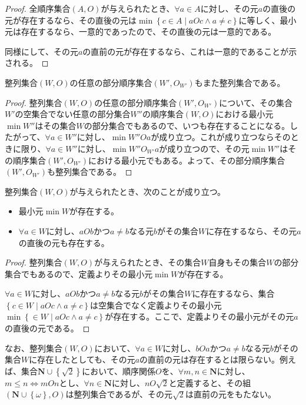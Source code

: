 \documentclass[dvipdfmx]{jsarticle}
\begin{document}
\begin{proof}
全順序集合$(A,O)$が与えられたとき、$\forall a \in A$に対し、その元$a$の直後の元が存在するなら、その直後の元は$\min\left\{ c \in A \middle| aOc \land a \neq c \right\}$に等しく、最小元は存在するなら、一意的であったので、その直後の元は一意的である。\par
同様にして、その元$a$の直前の元が存在するなら、これは一意的であることが示される。
\end{proof}
\begin{thm}\label{1.3.2.4}
整列集合$(W,O)$の任意の部分順序集合$\left( W',O_{W'} \right)$もまた整列集合である。
\end{thm}
\begin{proof}
整列集合$(W,O)$の任意の部分順序集合$\left( W',O_{W'} \right)$について、その集合$W'$の空集合でない任意の部分集合$W''$の順序集合$(W,O)$における最小元$\min W''$はその集合$W$の部分集合でもあるので、いつも存在することになる。したがって、$\forall a \in W''$に対し、$\min W''Oa$が成り立つ。これが成り立つならそのときに限り、$\forall a \in W''$に対し、$\min W''O_{W'}a$が成り立つので、その元$\min W''$はその順序集合$\left( W',O_{W'} \right)$における最小元でもある。よって、その部分順序集合$\left( W',O_{W'} \right)$も整列集合である。
\end{proof}
\begin{thm}\label{1.3.2.5}
整列集合$(W,O)$が与えられたとき、次のことが成り立つ。
\begin{itemize}
\item
  最小元$\min W$が存在する。
\item
  $\forall a \in W$に対し、$aOb$かつ$a \neq b$なる元$b$がその集合$W$に存在するなら、その元$a$の直後の元も存在する。
\end{itemize}
\end{thm}
\begin{proof}
整列集合$(W,O)$が与えられたとき、その集合$W$自身もその集合$W$の部分集合でもあるので、定義よりその最小元$\min W$が存在する。\par
$\forall a \in W$に対し、$aOb$かつ$a \neq b$なる元$b$がその集合$W$に存在するなら、集合$\left\{ c \in W \middle| aOc \land a \neq c \right\}$は空集合でなく定義よりその最小元$\min\left\{ \in W \middle| aOc \land a \neq c \right\}$が存在する。ここで、定義よりその最小元がその元$a$の直後の元である。
\end{proof}\par
なお、整列集合$(W,O)$において、$\forall a \in W$に対し、$bOa$かつ$a \neq b$なる元$b$がその集合$W$に存在したとしても、その元$a$の直前の元は存在するとは限らない。例えば、集合$\mathbf{N} \cup \left\{ \sqrt{2} \right\}$において、順序関係$O$を、$\forall m,n \in \mathbf{N}$に対し、$m \leq n \Leftrightarrow mOn$とし、$\forall n \in \mathbf{N}$に対し、$nO\sqrt{2}$と定義すると、その組$\left( \mathbf{N} \cup \left\{ \omega \right\},O \right)$は整列集合であるが、その元$\sqrt{2}$は直前の元をもたない。
\end{document}
